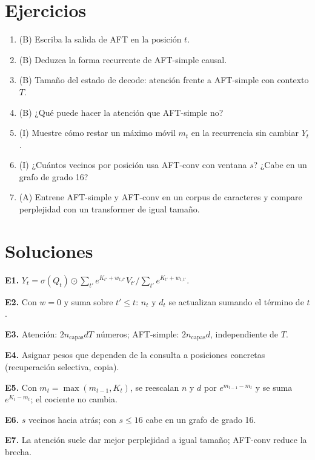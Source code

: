 \documentclass[11pt,a4paper]{article}
\begin{document}
\section{Ejercicios}
\begin{enumerate}[label=\textbf{E\arabic*.}]
\item (B) Escriba la salida de AFT en la posición $t$.
\item (B) Deduzca la forma recurrente de AFT-simple causal.
\item (B) Tamaño del estado de decode: atención frente a AFT-simple con contexto $T$.
\item (B) ¿Qué puede hacer la atención que AFT-simple no?
\item (I) Muestre cómo restar un máximo móvil $m_t$ en la recurrencia sin cambiar $Y_t$.
\item (I) ¿Cuántos vecinos por posición usa AFT-conv con ventana $s$? ¿Cabe en un grafo de grado 16?
\item (A) Entrene AFT-simple y AFT-conv en un corpus de caracteres y compare perplejidad con un transformer de igual tamaño.
\end{enumerate}
\section{Soluciones}
\begin{solucion}
\textbf{E1.} $Y_t=\sigma(Q_t)\odot\sum_{t'}e^{K_{t'}+w_{t,t'}}V_{t'}/\sum_{t'}e^{K_{t'}+w_{t,t'}}$.

\textbf{E2.} Con $w=0$ y suma sobre $t'\le t$: $n_t$ y $d_t$ se actualizan sumando el término de $t$.

\textbf{E3.} Atención: $2n_{\text{capas}}dT$ números; AFT-simple: $2n_{\text{capas}}d$, independiente de $T$.

\textbf{E4.} Asignar pesos que dependen de la consulta a posiciones concretas (recuperación selectiva, copia).

\textbf{E5.} Con $m_t=\max(m_{t-1},K_t)$, se reescalan $n$ y $d$ por $e^{m_{t-1}-m_t}$ y se suma $e^{K_t-m_t}$; el cociente no cambia.

\textbf{E6.} $s$ vecinos hacia atrás; con $s\le16$ cabe en un grafo de grado 16.

\textbf{E7.} La atención suele dar mejor perplejidad a igual tamaño; AFT-conv reduce la brecha.
\end{solucion}
\end{document}
